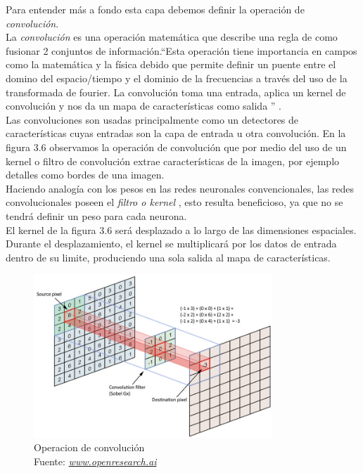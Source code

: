 Para entender más a fondo esta capa debemos definir la operación de \textit{convolución}.\\  La \textit{convolución} es una operación matemática que describe una regla de como fusionar 2 conjuntos de información.\textquotedblleft  Esta operación tiene importancia en campos como la matemática y la física debido que permite definir un puente entre el domino del espacio/tiempo y el dominio de la frecuencias a través del uso de la transformada de fourier.
La convolución toma una entrada, aplica un kernel de convolución y nos da un mapa de características como salida \textquotedblright \cite{book1} .\\
Las convoluciones son usadas principalmente como un detectores de características cuyas entradas son la capa de entrada u otra convolución.
En la figura 3.6 observamos la operación de convolución que por medio del uso de un kernel o filtro de convolución extrae características de la imagen, por ejemplo detalles como bordes de una imagen.\\ Haciendo analogía con los pesos en las redes neuronales convencionales, las redes convolucionales poseen el \textit{ filtro o kernel }, esto resulta beneficioso, ya que no se tendrá definir un peso para cada neurona.\\ El kernel de la figura 3.6 será desplazado a lo largo de las dimensiones espaciales. Durante el desplazamiento, el kernel se multiplicará por los datos de entrada dentro de su limite, produciendo una sola salida al mapa de características.
\begin{figure}[H]
	\centering
	\includegraphics[width=0.8\textwidth]{Figures/convolucion.jpeg}
	\caption{Operacion de convolución \\ Fuente:  \href{http://openresearch.ai/t/network-in-network/39}{\textit{www.openresearch.ai}}}
	\label{convolucion}
\end{figure} 

